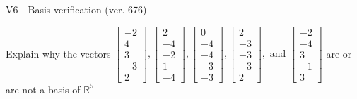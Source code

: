 \begin{exercise}
  \begin{exerciseTitle}V6 - Basis verification (ver. 676)\end{exerciseTitle}
  \begin{exerciseStatement}
    Explain why the vectors \(\left[\begin{array}{r}
-2 \\
4 \\
3 \\
-3 \\
2
\end{array}\right] , \left[\begin{array}{r}
2 \\
-4 \\
-2 \\
1 \\
-4
\end{array}\right] , \left[\begin{array}{r}
0 \\
-4 \\
-4 \\
-3 \\
-3
\end{array}\right] , \left[\begin{array}{r}
2 \\
-3 \\
-3 \\
-3 \\
2
\end{array}\right] , \text{ and } \left[\begin{array}{r}
-2 \\
-4 \\
3 \\
-1 \\
3
\end{array}\right]\) are or are not a basis of \(\mathbb{R}^5\)	



\end{exerciseStatement}
\end{exercise}
